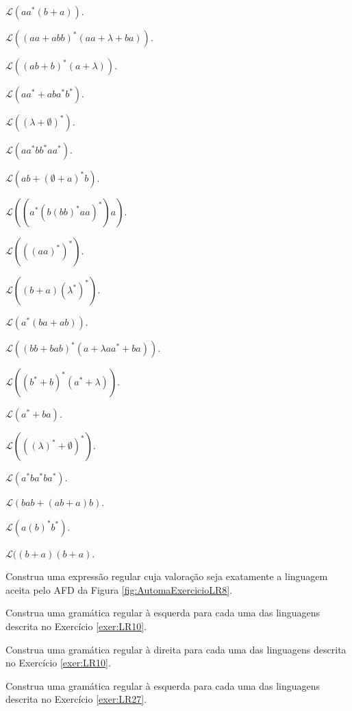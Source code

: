 \begin{exerList}
	\item $\mathcal{L}(aa^*(b + a))$.
	\item $\mathcal{L}((aa + abb)^*(aa + \lambda + ba))$.
	\item $\mathcal{L}((ab + b)^*(a + \lambda))$.
	\item $\mathcal{L}(aa^* + aba^*b^*)$.
	\item $\mathcal{L}((\lambda + \emptyset)^*)$.
	\item $\mathcal{L}(aa^*bb^*aa^*)$.
	\item $\mathcal{L}(ab + (\emptyset + a)^*b)$.
	\item $\mathcal{L}((a^*(b(bb)^*aa)^*)a)$.
	\item $\mathcal{L}(((aa)^*)^*)$.
	\item $\mathcal{L}((b + a)(\lambda^*)^*)$.
	\item $\mathcal{L}(a^*(ba + ab))$.
	\item $\mathcal{L}((bb + bab)^*(a + \lambda aa^* + ba))$.
	\item $\mathcal{L}((b^* + b)^*(a^* + \lambda))$.
	\item $\mathcal{L}(a^* + ba)$.
	\item $\mathcal{L}(((\lambda)^* + \emptyset)^*)$.
	\item $\mathcal{L}(a^*ba^*ba^*)$.
	\item $\mathcal{L}(bab + (ab + a)b)$.
	\item $\mathcal{L}(a(b)^*b^*)$.
	\item $\mathcal{L}((b + a)(b + a)$.
\end{exerList}

\begin{questao}\label{exer:EGR43}
	Construa uma expressão regular cuja valoração seja exatamente a linguagem aceita pelo AFD da Figura \ref{fig:AutomaExercicioLR8}. 
\end{questao}

\begin{questao}\label{exer:EGR44}
	Construa uma gramática regular à esquerda para cada uma das linguagens descrita no Exercício \ref{exer:LR10}.
\end{questao}

\begin{questao}\label{exer:EGR45}
	Construa uma gramática regular à direita para cada uma das linguagens descrita no Exercício \ref{exer:LR10}.
\end{questao}

\begin{questao}\label{exer:EGR46}
	Construa uma gramática regular à esquerda para cada uma das linguagens descrita no Exercício \ref{exer:LR27}.
\end{questao}

